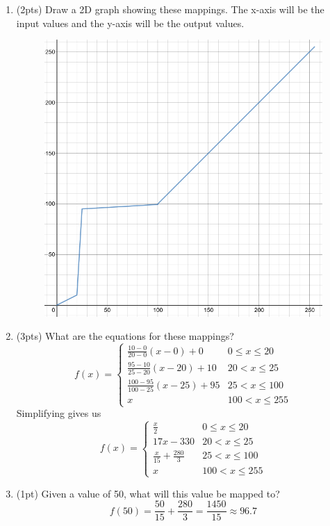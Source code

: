 \documentclass{article}
\begin{document}
\begin{enumerate}
\begin{enumerate}
\item(2pts) Draw a 2D graph showing these mappings.  The x-axis will be the input values and the y-axis will be the output values.
\begin{figure}
    \includegraphics[width=\linewidth]{images/1-3-a.png}
\end{figure}


\item (3pts) What are the equations for these mappings?
$$ f(x) = \begin{cases}
    \frac{10-0}{20-0} (x-0) + 0 & 0 \leq x \leq 20 \\
    \frac{95-10}{25-20}(x-20) + 10 & 20 < x \leq 25 \\
    \frac{100-95}{100-25}(x-25) + 95 & 25 < x \leq 100 \\
    x & 100 < x \leq 255
 \end{cases} $$
Simplifying gives us
$$ f(x) = \begin{cases}
    \frac{x}{2} & 0 \leq x \leq 20 \\
    17x-330 & 20 < x \leq 25 \\
    \frac{x}{15}+\frac{280}{3} & 25 < x \leq 100 \\
    x & 100 < x \leq 255
 \end{cases} $$

\item (1pt) Given a value of 50, what will this value be mapped to?
$$f(50) = \frac{50}{15}+\frac{280}{3} = \frac{1450}{15} \approx 96.7 $$
\end{enumerate}
\end{enumerate}
\end{document}
